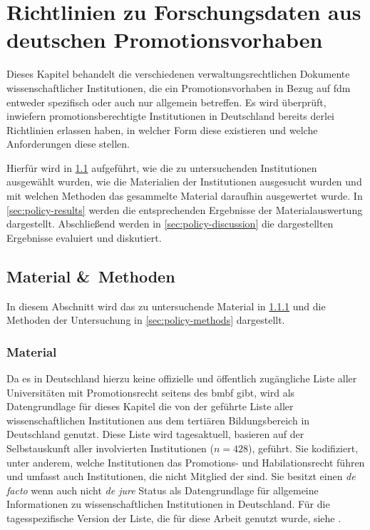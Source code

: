 \chapter{Richtlinien zu Forschungsdaten aus deutschen Promotionsvorhaben}\label{ch:richtlinien}
Dieses Kapitel behandelt die verschiedenen verwaltungsrechtlichen Dokumente wissenschaftlicher Institutionen, die ein Promotionsvorhaben in Bezug auf \gls{fdm} entweder spezifisch oder auch nur allgemein betreffen.
Es wird überprüft, inwiefern promotionsberechtigte Institutionen in Deutschland bereits derlei Richtlinien erlassen haben, in welcher Form diese existieren und welche Anforderungen diese stellen.

Hierfür wird in \cref{sec:policy-material-methods} aufgeführt, wie die zu untersuchenden Institutionen ausgewählt wurden, wie die Materialien der Institutionen ausgesucht wurden und mit welchen Methoden das gesammelte Material daraufhin ausgewertet wurde.
In \cref{sec:policy-results} werden die entsprechenden Ergebnisse der Materialauswertung dargestellt.
Abschließend werden in \cref{sec:policy-discussion} die dargestellten Ergebnisse evaluiert und diskutiert.

\section{Material \&\ Methoden}\label{sec:policy-material-methods}
In diesem Abschnitt wird das zu untersuchende Material in \cref{sec:policy-material} und die Methoden der Untersuchung in \cref{sec:policy-methods} dargestellt.

\subsection{Material}\label{sec:policy-material}
Da es in Deutschland hierzu keine offizielle und öffentlich zugängliche Liste aller Universitäten mit Promotionsrecht seitens des \gls{bmbf} gibt, wird als Datengrundlage für dieses Kapitel die von der \citeauthor{Hochschulkompass-Liste} geführte Liste aller wissenschaftlichen Institutionen aus dem tertiären Bildungsbereich in Deutschland \autocite{Hochschulkompass-Liste} genutzt.
Diese Liste wird tagesaktuell, basieren auf der Selbstauskunft aller involvierten Institutionen ($n=428$), geführt.
Sie kodifiziert, unter anderem, welche Institutionen das Promotions- und Habilationsrecht führen und umfasst auch Institutionen, die nicht Mitglied der \citeauthor{Hochschulkompass-Liste} sind.
Sie besitzt einen \textit{de facto} wenn auch nicht \textit{de jure} Status als Datengrundlage für allgemeine Informationen zu wissenschaftlichen Institutionen in Deutschland.
Für die tagesspezifische Version der Liste, die für diese Arbeit genutzt wurde, siehe \autocite{my-dataset}.

